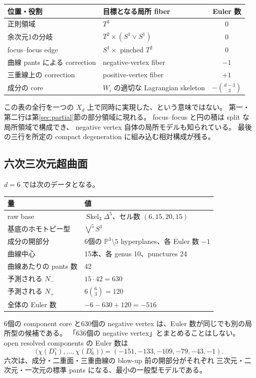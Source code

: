 \documentclass[11pt,a4paper]{article}
\theoremstyle{definition}
\newcommand{\PP}{\mathbb P}
\newcommand{\Sk}{\operatorname{Skel}}
\newcommand{\figeight}{(S^1\vee S^1)}
\begin{document}
\begin{center}
\begin{tabularx}{\linewidth}{@{}lXc@{}}
\toprule
位置・役割 & 目標となる局所 fiber & Euler 数\\
\midrule
正則領域 & $T^3$ & 0\\
余次元1の分岐 & $T^2\times\figeight$ & 0\\
focus--focus edge & $S^1\times$ pinched $T^2$ & 0\\
曲線 pants による correction & negative-vertex fiber & $-1$\\
三重線上の correction & positive-vertex fiber & $+1$\\
成分の core & $W_i$ の適切な Lagrangian skeleton & $-\binom{d-3}{3}$\\
\bottomrule
\end{tabularx}
\end{center}
この表の全行を一つの $X_d$ 上で同時に実現した、という意味ではない。
第一・第二行は第\ref{sec:partial}節の部分領域に現れる。
focus--focus と円の積は split な局所領域で構成でき、
negative vertex 自体の局所モデルも知られている\cite{em}。
最後の三行を所定の compact degeneration に組み込む相対構成が残る。

\subsection{六次三次元超曲面}

$d=6$ では次のデータとなる。
\begin{center}
\begin{tabularx}{\linewidth}{@{}lX@{}}
\toprule
量 & 値\\
\midrule
raw base & $\Sk_3\Delta^5$、セル数 $(6,15,20,15)$\\
基底のホモトピー型 & $\bigvee^5S^3$\\
成分の開部分 & 6個の $\PP^3\setminus5$ hyperplanes、各 Euler 数 $-1$\\
曲線中心 & 15本、各 genus 10、punctures 24\\
曲線あたりの pants 数 & 42\\
予測される $N_-$ & $15\cdot42=630$\\
予測される $N_+$ & $6\binom63=120$\\
全体の Euler 数 & $-6-630+120=-516$\\
\bottomrule
\end{tabularx}
\end{center}
6個の component core と630個の negative vertex は、Euler 数が同じでも別の局所型の候補である。
「636個の negative vertex」とまとめることはしない。
open resolved components の Euler 数は
\[
\bigl(\chi(D_1^\circ),\ldots,\chi(D_6^\circ)\bigr)
=(-151,-133,-109,-79,-43,-1).
\]
六次は、成分・二重面・三重曲線の blow-up 前の開部分がそれぞれ
三次元・二次元・一次元の標準 pants になる、最小の一般型モデルである。
\end{document}
